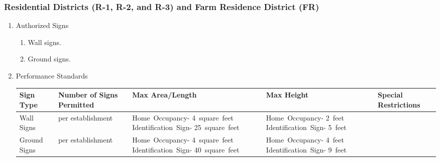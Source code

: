 \subsubsection{Residential Districts (R-1, R-2, and R-3) and Farm Residence District (FR)}
\begin{enumerate}[{\indent}a)]
    \item Authorized Signs 
    \begin{enumerate}
        \item Wall signs.
        \item Ground signs.
    \end{enumerate}  
    \item Performance Standards 
    \begin{center}
        \begin{tabular}{| >{\centering\arraybackslash}m{2.5cm} | >{\centering\arraybackslash}m{2.5cm} | >{\centering\arraybackslash}m{2.5cm} | >{\centering\arraybackslash}m{2.5cm} | >{\centering\arraybackslash}m{2.5cm} |}
            \hline
            \textbf{Sign Type} & \textbf{Number of Signs Permitted} & \textbf{Max Area/Length} & \textbf{Max Height} & \textbf{Special Restrictions}\\
            \hline
            Wall Signs & 1 per establishment & \mbox{Home Occupancy-} \mbox{4 square feet} \mbox{Identification Sign-} \mbox{25 square feet} & \mbox{Home Occupancy-} \mbox{2 feet} \mbox{Identification Sign-} \mbox{5 feet} & \\
            \hline
            Ground Signs & 1 per establishment & \mbox{Home Occupancy-} \mbox{4 square feet} \mbox{Identification Sign-} \mbox{40 square feet} & \mbox{Home Occupancy-} \mbox{4 feet} \mbox{Identification Sign-} \mbox{9 feet} & \\
            \hline
        \end{tabular}
    \end{center}
\end{enumerate}
